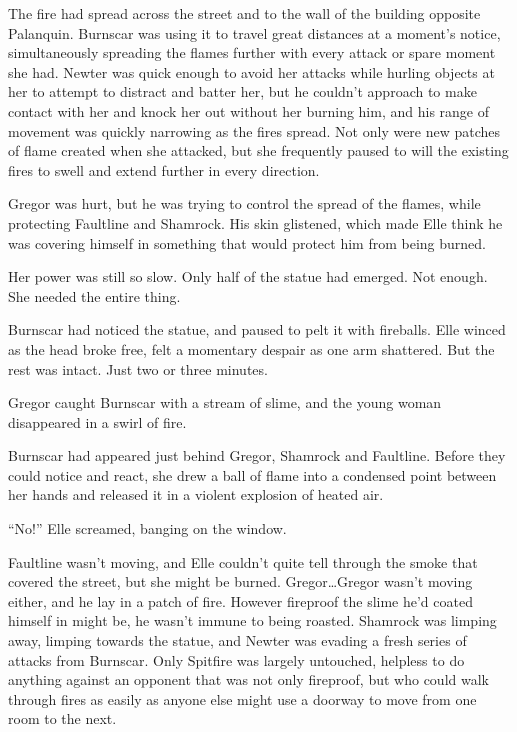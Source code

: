 The fire had spread across the street and to the wall of the building opposite Palanquin.  Burnscar was using it to travel great distances at a moment's notice, simultaneously spreading the flames further with every attack or spare moment she had.  Newter was quick enough to avoid her attacks while hurling objects at her to attempt to distract and batter her, but he couldn't approach to make contact with her and knock her out without her burning him, and his range of movement was quickly narrowing as the fires spread.  Not only were new patches of flame created when she attacked, but she frequently paused to will the existing fires to swell and extend further in every direction.



Gregor was hurt, but he was trying to control the spread of the flames, while protecting Faultline and Shamrock.  His skin glistened, which made Elle think he was covering himself in something that would protect him from being burned.



Her power was still so slow.  Only half of the statue had emerged.  Not enough.  She needed the entire thing.



Burnscar had noticed the statue, and paused to pelt it with fireballs.  Elle winced as the head broke free, felt a momentary despair as one arm shattered.  But the rest was intact.  Just two or three minutes.



Gregor caught Burnscar with a stream of slime, and the young woman disappeared in a swirl of fire.



Burnscar had appeared just behind Gregor, Shamrock and Faultline.  Before they could notice and react, she drew a ball of flame into a condensed point between her hands and released it in a violent explosion of heated air.



``No!'' Elle screamed, banging on the window.



Faultline wasn't moving, and Elle couldn't quite tell through the smoke that covered the street, but she might be burned.  Gregor\ldots Gregor wasn't moving either, and he lay in a patch of fire.  However fireproof the slime he'd coated himself in might be, he wasn't immune to being roasted.  Shamrock was limping away, limping towards the statue, and Newter was evading a fresh series of attacks from Burnscar.  Only Spitfire was largely untouched, helpless to do anything against an opponent that was not only fireproof, but who could walk through fires as easily as anyone else might use a doorway to move from one room to the next.



